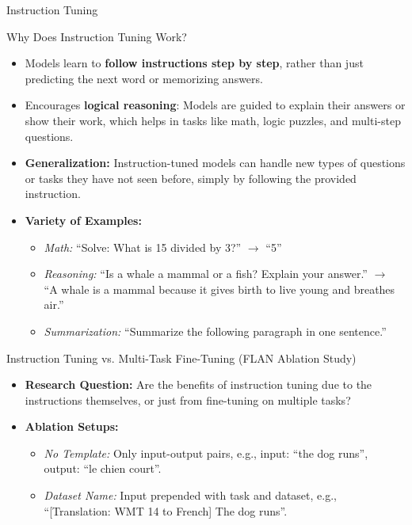 \begin{frame}[allowframebreaks]{Instruction Tuning}
\begin{itemize}
\begin{itemize}
            \end{itemize}
        \end{itemize}
\framebreak
    \begin{block}{Why Does Instruction Tuning Work?}
        \begin{itemize}
            \item Models learn to \textbf{follow instructions step by step}, rather than just predicting the next word or memorizing answers.
            \item Encourages \textbf{logical reasoning}: Models are guided to explain their answers or show their work, which helps in tasks like math, logic puzzles, and multi-step questions.
            \item \textbf{Generalization:} Instruction-tuned models can handle new types of questions or tasks they have not seen before, simply by following the provided instruction.
            \item \textbf{Variety of Examples:}
            \begin{itemize}
                \item \textit{Math:} ``Solve: What is 15 divided by 3?'' $\rightarrow$ ``5''
                \item \textit{Reasoning:} ``Is a whale a mammal or a fish? Explain your answer.'' $\rightarrow$ ``A whale is a mammal because it gives birth to live young and breathes air.''
                \item \textit{Summarization:} ``Summarize the following paragraph in one sentence.''
            \end{itemize}
        \end{itemize}
    \end{block}
    \framebreak
    \begin{block}{Instruction Tuning vs. Multi-Task Fine-Tuning (FLAN Ablation Study)}
        \begin{itemize}
            \item \textbf{Research Question:} Are the benefits of instruction tuning due to the instructions themselves, or just from fine-tuning on multiple tasks?
            \item \textbf{Ablation Setups:}
            \begin{itemize}
                \item \textit{No Template:} Only input-output pairs, e.g., input: ``the dog runs'', output: ``le chien court''.
                \item \textit{Dataset Name:} Input prepended with task and dataset, e.g., ``[Translation: WMT 14 to French] The dog runs''.

\end{itemize}
\end{itemize}
\end{block}
\end{frame}
